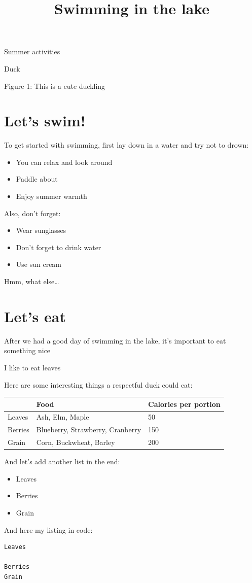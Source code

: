 \documentclass[11pt,a4paper]{article}
\title{Swimming in the lake}
\begin{document}
\maketitle

Summer activities

Duck

Figure 1: This is a cute duckling

\section{Let’s swim!}

To get started with swimming, first lay down in a water and try not to drown:

\begin{itemize}
\item You can relax and look around
\item Paddle about
\item Enjoy summer warmth
\end{itemize}

Also, don’t forget:

\begin{itemize}
\item Wear sunglasses
\item Don’t forget to drink water
\item Use sun cream
\end{itemize}

Hmm, what else…

\section{Let’s eat}

After we had a good day of swimming in the lake, it’s important to eat something nice

I like to eat leaves

Here are some interesting things a respectful duck could eat:

\begin{table}[h]
\begin{tabular}{|l|l|l|}
\hline
 & Food & Calories per portion \\ \hline
Leaves & Ash, Elm, Maple & 50 \\ \hline
Berries & Blueberry, Strawberry, Cranberry & 150 \\ \hline
Grain & Corn, Buckwheat, Barley & 200 \\ \hline
\end{tabular}
\end{table}

And let’s add another list in the end:

\begin{itemize}
\item Leaves
\item Berries
\item Grain
\end{itemize}

And here my listing in code:

\begin{verbatim}
Leaves

Berries
Grain
\end{verbatim}
\end{document}
